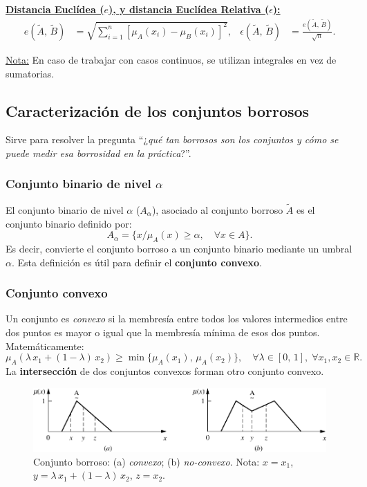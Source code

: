 \documentclass[10pt,a4paper]{article}
\begin{document}
\underline{\textbf{Distancia Euclídea ($e$), y distancia Euclídea Relativa ($\epsilon$):}}
\begin{align*}
e(\tilde{A}, \, \tilde{B}) &= \sqrt{\sum_{i=1}^n [\mu_A(x_i)-\mu_B(x_i)]^2},
&\epsilon(\tilde{A}, \, \tilde{B}) &= \frac{e(\tilde{A}, \, \tilde{B})}{\sqrt{n}}.
\end{align*}

\underline{Nota:} En caso de trabajar con casos continuos, se utilizan integrales en vez de sumatorias.

\subsection{Caracterización de los conjuntos borrosos}

Sirve para resolver la pregunta ``¿\textit{qué tan borrosos son los conjuntos y cómo se puede medir esa borrosidad en la práctica}?''.

\subsubsection{Conjunto binario de nivel $\alpha$}

El conjunto binario de nivel $\alpha$ ($A_\alpha$), asociado al conjunto borroso $\tilde{A}$ es el conjunto binario definido por:
\[
A_{\alpha} =\{x/\mu_A(x)\geq \alpha, \quad \forall x \in A\}.
\]
Es decir, convierte el conjunto borroso a un conjunto binario mediante un umbral $\alpha$. Esta definición es útil para definir el \textbf{conjunto convexo}.

\subsubsection{Conjunto convexo}

Un conjunto es \textit{convexo} si la membresía entre todos los valores intermedios entre dos puntos es mayor o igual que la membresía mínima de esos dos puntos. Matemáticamente:
\[
\mu_A(\lambda\, x_1+(1-\lambda)\, x_2) \geq \min \{ \mu_A(x_1),\,\mu_A(x_2)\}, 
\quad \forall \lambda \in [0,\,1], \;\forall x_1, x_2 \in \mathbb{R}.
\]
La \textbf{intersección} de dos conjuntos convexos forman otro conjunto convexo.

\begin{figure}[ht!]
  \caption{Conjunto borroso: (a) \textit{convexo}; (b) \textit{no-convexo}. Nota: $x=x_1$, $y=\lambda\, x_1+(1-\lambda)\, x_2$, $z=x_2$.}
  \label{fig:convexo}
  \centerline{\includegraphics[width=0.8\textwidth-\fboxrule-\fboxrule]{imgs/convexo.png}}
\end{figure}
\end{document}
